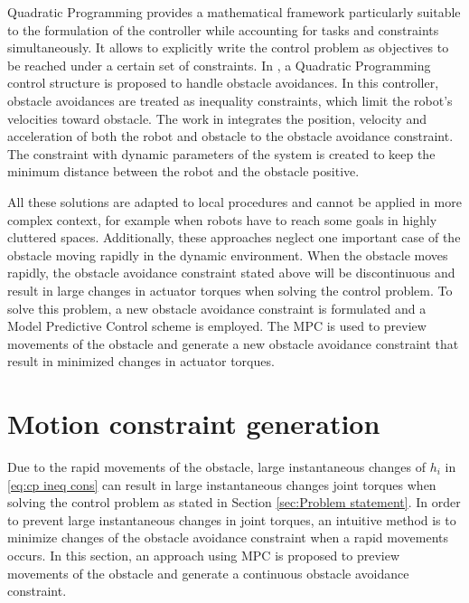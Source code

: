 Quadratic Programming provides a mathematical framework particularly suitable to the formulation of the controller while accounting for tasks and constraints simultaneously. It allows to explicitly write the control problem as objectives to be reached under a certain set of constraints.  In \cite{faverjon1987, zhang2004obstacle}, a Quadratic Programming control structure is proposed to handle obstacle avoidances. In this controller, obstacle avoidances are treated as inequality constraints, which limit the robot's velocities toward obstacle. The work in \cite{salini2012} integrates the position, velocity and acceleration of both the robot and obstacle to the obstacle avoidance constraint. The constraint with dynamic parameters of the system is created to keep the minimum distance between the robot and the obstacle positive.

All these solutions are adapted to local procedures and cannot be applied in more complex context, for example when robots have to reach some goals in highly cluttered spaces. Additionally, these approaches neglect one important case of the obstacle moving rapidly in the dynamic environment. When the obstacle moves rapidly, the obstacle avoidance constraint stated above will be discontinuous and result in large changes in actuator torques when solving the control problem. To solve this problem, a new obstacle avoidance constraint is formulated and a Model Predictive Control scheme is employed. The MPC is used to preview movements of the obstacle and generate a new obstacle avoidance constraint that result in minimized changes in actuator torques.

\section{Motion constraint generation}
\label{sec:motion constraint}

Due to the rapid movements of the obstacle, large instantaneous changes of $h_i$ in \eqref{eq:cp ineq cons} can result in large instantaneous changes joint torques when solving the control problem as stated in Section \ref{sec:Problem statement}. In order to prevent large instantaneous changes in joint torques, an intuitive method is to minimize changes of the obstacle avoidance constraint when a rapid movements occurs. In this section, an approach using MPC is proposed to preview movements of the obstacle and generate a continuous obstacle avoidance constraint.

